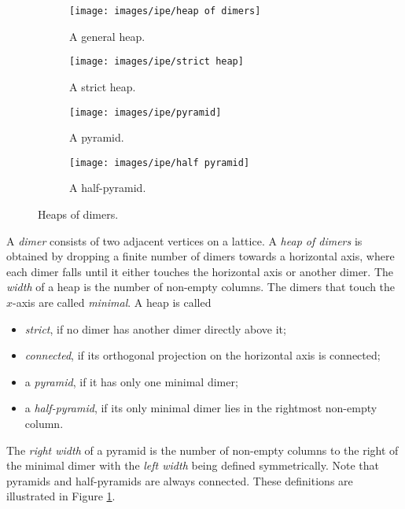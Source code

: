 \begin{figure}[hbt!]
  \centering
  \begin{subfigure}{0.24 \textwidth}
    \centering
    \texttt{[image: images/ipe/heap of dimers]}
    \caption{A general heap.}
  \end{subfigure}
  \hfill
  \begin{subfigure}{0.24 \textwidth}
    \centering
    \texttt{[image: images/ipe/strict heap]}
    \caption{A strict heap.}
  \end{subfigure}
  \hfill
  \begin{subfigure}{0.24 \textwidth}
    \centering
    \texttt{[image: images/ipe/pyramid]}
    \caption{A pyramid.}
  \end{subfigure}
  \hfill
  \begin{subfigure}{0.24 \textwidth}
    \centering
    \texttt{[image: images/ipe/half pyramid]}
    \caption{A half-pyramid.}
  \end{subfigure}
  \caption{Heaps of dimers.}
  \label{fig:heaps}
\end{figure}

\begin{definition}
  A \textit{dimer} consists of two adjacent vertices on a lattice. 
  A \textit{heap of dimers} is obtained by dropping a finite number of dimers towards a horizontal axis, where each dimer falls until it either touches the horizontal axis or another dimer. 
  The \textit{width} of a heap is the number of non-empty columns. The dimers that touch the $x$-axis are called \textit{minimal}.
  A heap is called
  \begin{itemize}
    \item \textit{strict}, if no dimer has another dimer directly above it;
    \item \textit{connected}, if its orthogonal projection on the horizontal axis is connected;
    \item a \textit{pyramid}, if it has only one minimal dimer;
    \item a \textit{half-pyramid}, if its only minimal dimer lies in the rightmost non-empty column.
  \end{itemize}
  The \textit{right width} of a pyramid is the number of non-empty columns to the right of the minimal dimer with the \textit{left width} being defined symmetrically.
  Note that pyramids and half-pyramids are always connected.
  These definitions are illustrated in Figure \ref{fig:heaps}.
\end{definition}

